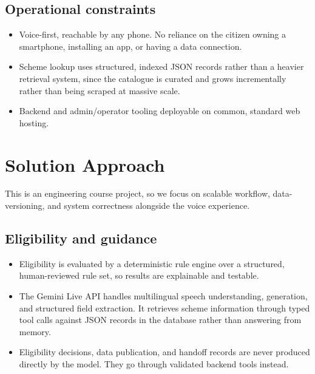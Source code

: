 \documentclass[11pt,a4paper]{article}
\begin{document}
\subsection{Operational constraints}
\begin{itemize}[leftmargin=0.7cm]
    \item Voice-first, reachable by any phone. No reliance on the citizen owning a smartphone, installing an app, or having a data connection.
    \item Scheme lookup uses structured, indexed JSON records rather than a heavier retrieval system, since the catalogue is curated and grows incrementally rather than being scraped at massive scale.
    \item Backend and admin/operator tooling deployable on common, standard web hosting.
\end{itemize}

\section{Solution Approach}
This is an engineering course project, so we focus on scalable workflow, data-versioning, and system correctness alongside the voice experience.

\subsection{Eligibility and guidance}
\begin{itemize}[leftmargin=0.7cm]
    \item Eligibility is evaluated by a deterministic rule engine over a structured, human-reviewed rule set, so results are explainable and testable.
    \item The Gemini Live API handles multilingual speech understanding, generation, and structured field extraction. It retrieves scheme information through typed tool calls against JSON records in the database rather than answering from memory.
    \item Eligibility decisions, data publication, and handoff records are never produced directly by the model. They go through validated backend tools instead.
\end{itemize}
\end{document}
